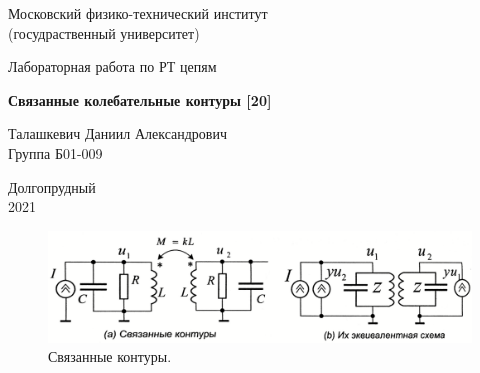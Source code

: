 \documentclass[a4paper, 14pt]{extarticle}%
\date{}
\begin{document}
\begin{titlepage}

	\newpage
	\begin{center}
		\normalsize Московский физико-технический институт \\(госудраственный 			университет)
	\end{center}

	\vspace{6em}

	\begin{center}
		\Large Лабораторная работа по РТ цепям\\
	\end{center}

	\vspace{1em}

	\begin{center}
		\large \textbf{Связанные колебательные контуры [20]}
	\end{center}

	\vspace{2em}

	\begin{center}
		\large Талашкевич Даниил Александрович\\
		Группа Б01-009
	\end{center}

	\vspace{\fill}

	\begin{center}
	Долгопрудный \\2021
	\end{center}
	
\end{titlepage}

	\thispagestyle{empty}
	\newpage
	\tableofcontents
	\newpage
	\setcounter{page}{1}


\begin{figure}[h]
	\centering
	\includegraphics[width =  0.9\linewidth]{cvk}
	\caption{Связанные контуры.}
\end{figure}
\end{document}
